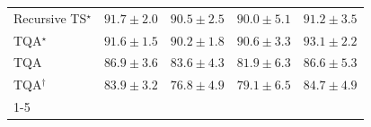 \begin{tabular}{l|cccc|}
Recursive TS$^\star$ & {\cellcolor[HTML]{034E7B}} \color[HTML]{F1F1F1} $91.7\pm 2.0$ & {\cellcolor[HTML]{045687}} \color[HTML]{F1F1F1} $90.5\pm 2.5$ & {\cellcolor[HTML]{04598C}} \color[HTML]{F1F1F1} $90.0\pm 5.1$ & {\cellcolor[HTML]{045280}} \color[HTML]{F1F1F1} $91.2\pm 3.5$ \\
TQA$^\star$ & {\cellcolor[HTML]{034F7D}} \color[HTML]{F1F1F1} $91.6\pm 1.5$ & {\cellcolor[HTML]{04588A}} \color[HTML]{F1F1F1} $90.2\pm 1.8$ & {\cellcolor[HTML]{045687}} \color[HTML]{F1F1F1} $90.6\pm 3.3$ & {\cellcolor[HTML]{03466E}} \color[HTML]{F1F1F1} $93.1\pm 2.2$ \\
TQA & {\cellcolor[HTML]{0567A1}} \color[HTML]{F1F1F1} $86.9\pm 3.6$ & {\cellcolor[HTML]{0F76B3}} \color[HTML]{F1F1F1} $83.6\pm 4.3$ & {\cellcolor[HTML]{1E80B8}} \color[HTML]{F1F1F1} $81.9\pm 6.3$ & {\cellcolor[HTML]{0568A3}} \color[HTML]{F1F1F1} $86.6\pm 5.3$ \\
TQA$^\dagger$ & {\cellcolor[HTML]{0C74B2}} \color[HTML]{F1F1F1} $83.9\pm 3.2$ & {\cellcolor[HTML]{549CC7}} \color[HTML]{F1F1F1} $76.8\pm 4.9$ & {\cellcolor[HTML]{3991C1}} \color[HTML]{F1F1F1} $79.1\pm 6.5$ & {\cellcolor[HTML]{056FAF}} \color[HTML]{F1F1F1} $84.7\pm 4.9$ \\
\cline{1-5}
\bottomrule
\end{tabular}

